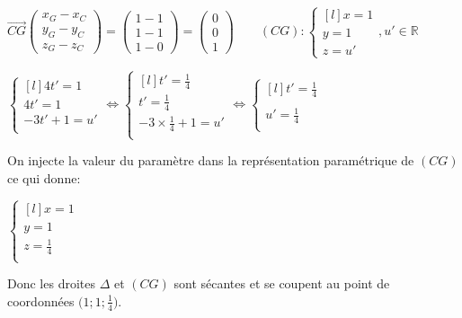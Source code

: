 \documentclass{article}
\begin{document}
\vspace{2mm}

$\overrightarrow{CG}
\begin{pmatrix}
   x_G-x_C\\
   y_G-y_C\\
   z_G-z_C
\end{pmatrix}
=
\begin{pmatrix}
   1 - 1\\
   1 - 1\\
   1 - 0
\end{pmatrix}
= 
\begin{pmatrix}
   0\\
   0\\
   1
\end{pmatrix}
\qquad
(CG):\left\{\begin{matrix*}[l]
x = 1\\
y = 1\\
z = u'
\end{matrix*}
\right., u' \in \mathbb{R}
$


\vspace{2mm}

$
\left\{\begin{matrix*}[l]
   4t'=1\\
   4t'=1\\
   -3t'+1=u'\\
\end{matrix*}\right.
\Leftrightarrow
\left\{\begin{matrix*}[l]
   t' = \frac{1}{4}\\
   t' = \frac{1}{4}\\
   -3 \times \frac{1}{4} + 1 = u'\\
\end{matrix*}\right.
\Leftrightarrow
\left\{\begin{matrix*}[l]
   t' = \frac{1}{4}\\
   \\
   u' = \frac{1}{4}\\
\end{matrix*}\right.
$

\vspace{2mm}

\noindent On injecte la valeur du paramètre dans la représentation paramétrique de $(CG)$ ce qui donne:

\vspace{2mm}
$
\left\{\begin{matrix*}[l]
   x = 1\\
   y = 1\\
   z = \frac{1}{4}\\
\end{matrix*}\right.
$

\noindent Donc les droites $\Delta$ et $(CG)$ sont sécantes et se coupent au point de coordonnées $\Bigg(1; 1; \displaystyle\frac{1}{4}\Bigg)$.
\end{document}
